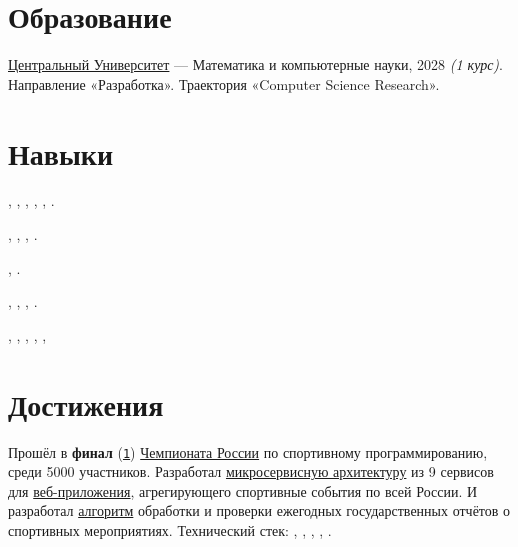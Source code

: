 \documentclass[margin,line]{resume}
\begin{document}
\begin{resume}
  \section{\mysidestyle Образование}
  \href{https://centraluniversity.ru/}{Центральный Университет} —
  Математика и компьютерные науки, 2028 \textit{(1 курс)}.
  Направление «Разработка». Траектория «Computer Science Research».

  \section{\mysidestyle Навыки}

  \vspace{0.4mm}
  \begin{description}[leftmargin=0pt, itemindent=*, itemsep=0.2pt]
    \item[Go:] , ,
      , ,
      , .
    \item[Databases:] , ,
      , .
    \item[Message brokers:] , .
    \item[Other technologies:] , ,
      , .
    \item[Dev tools:] , ,
      , , ,
  \end{description}

  \section{\mysidestyle Достижения}
  Прошёл в
  \textbf{финал}
  (\href{https://alchemmist.github.io/CV/attachments/russian-chemp-final.pdf}{\texttt{1}})
  \href{https://events.fsp-russia.com/championship}{Чемпионата
  России} по спортивному
  программированию, среди 5000 участников. Разработал
  \href{https://alchemmist.github.io/CV/attachments/architect.pdf}{микросервисную
  архитектуру} из 9 сервисов для
  \href{https://github.com/alchemmist/sportprog}{веб-приложения},
  агрегирующего спортивные события по
  всей России. И разработал
  \href{https://github.com/alchemmist/sport-afisha/blob/main/event_parsing_service/parse_pdf.py}{алгоритм}
  обработки и проверки ежегодных
  государственных
  отчётов о спортивных мероприятиях. Технический стек:
  , ,
  ,
  ,
  .


\end{resume}
\end{document}
